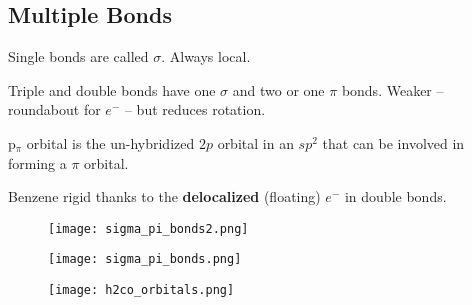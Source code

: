 \begin{mdframed}
\begin{multicols}{2}
\subsection{Multiple Bonds}
\begin{compactdesc}
\item[Single bonds] are called $\sigma$. Always local.
\item[Triple and double bonds] have one $\sigma$ and two or one $\pi$ bonds.
    Weaker -- roundabout for $e^-$ -- but reduces rotation.
\item[p$_\pi$ orbital] is the un-hybridized $2p$ orbital in an $sp^2$ that can
    be involved in forming a $\pi$ orbital.
\item[Benzene] rigid thanks to the \textbf{delocalized} (floating) $e^-$ in
    double bonds.
\end{compactdesc}
\begin{figure}[H]
\centering
\texttt{[image: sigma\_pi\_bonds2.png]}
\end{figure}
\begin{figure}[H]
\centering
\texttt{[image: sigma\_pi\_bonds.png]}
\end{figure}
\begin{figure}[H]
\centering
\texttt{[image: h2co\_orbitals.png]}
\end{figure}

\end{multicols}
\end{mdframed}




